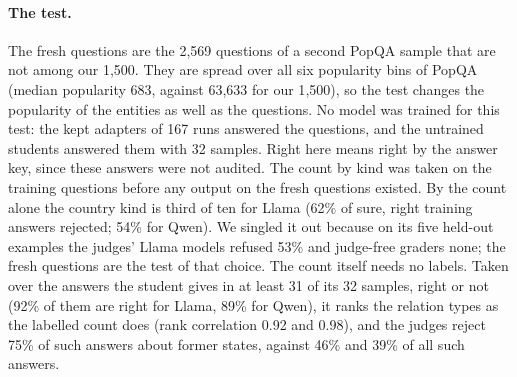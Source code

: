 \begin{table}[t]
\small
\centering
\setlength{\tabcolsep}{4.2pt}
\caption{Kinds of question on 2{,}569 PopQA questions that no model had seen (35\% cut; four judges averaged). $n$: fresh questions of the kind that the untrained student answers correctly in its greedy answer and in at least 31 of 32 samples. \emph{Rejected in training}: share of such answers on the training questions that the judges reject, counted before training. \emph{Refused}: share of the $n$ answers refused by the judges' models, by models trained with random rejections at matched abstention, with the student's own unanimous vote, and with the answer key. \emph{Excess}: judges minus random rejections. Kinds with at least 5 such training answers and 10 such fresh answers.}
\label{tab:kinds}
\end{table}

\paragraph{The test.} The fresh questions are the 2{,}569 questions of a second PopQA sample that are not among our 1{,}500. They are spread over all six popularity bins of PopQA (median popularity 683, against 63{,}633 for our 1{,}500), so the test changes the popularity of the entities as well as the questions. No model was trained for this test: the kept adapters of 167 runs answered the questions, and the untrained students answered them with 32 samples. Right here means right by the answer key, since these answers were not audited. The count by kind was taken on the training questions before any output on the fresh questions existed. By the count alone the country kind is third of ten for Llama (62\% of sure, right training answers rejected; 54\% for Qwen). We singled it out because on its five held-out examples the judges' Llama models refused 53\% and judge-free graders none; the fresh questions are the test of that choice. The count itself needs no labels. Taken over the answers the student gives in at least 31 of its 32 samples, right or not (92\% of them are right for Llama, 89\% for Qwen), it ranks the relation types as the labelled count does (rank correlation 0.92 and 0.98), and the judges reject 75\% of such answers about former states, against 46\% and 39\% of all such answers.


